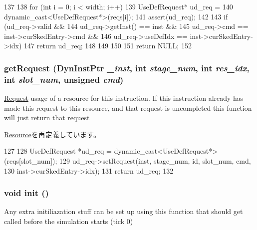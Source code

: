 \begin{DoxyCode}
137 {
138     for (int i = 0; i < width; i++) {
139         UseDefRequest* ud_req =
140             dynamic_cast<UseDefRequest*>(reqs[i]);
141         assert(ud_req);
142 
143         if (ud_req->valid &&
144             ud_req->getInst() == inst &&
145             ud_req->cmd == inst->curSkedEntry->cmd &&
146             ud_req->useDefIdx == inst->curSkedEntry->idx) {
147             return ud_req;
148         }
149     }
150 
151     return NULL;
152 }
\end{DoxyCode}
\hypertarget{classUseDefUnit_aae5ce84f94a1057d7f60172daf5d731d}{
\subsubsection[{getRequest}]{ getRequest ({\bf DynInstPtr} {\em \_\-inst}, \/  int {\em stage\_\-num}, \/  int {\em res\_\-idx}, \/  int {\em slot\_\-num}, \/  unsigned {\em cmd})}}
\label{classUseDefUnit_aae5ce84f94a1057d7f60172daf5d731d}
\hyperlink{classRequest}{Request} usage of a resource for this instruction. If this instruction already has made this request to this resource, and that request is uncompleted this function will just return that request 

\hyperlink{classResource_aae5ce84f94a1057d7f60172daf5d731d}{Resource}を再定義しています。


\begin{DoxyCode}
127 {
128     UseDefRequest *ud_req = dynamic_cast<UseDefRequest*>(reqs[slot_num]);
129     ud_req->setRequest(inst, stage_num, id, slot_num, cmd,
130                        inst->curSkedEntry->idx);
131     return ud_req;
132 }
\end{DoxyCode}
\hypertarget{classUseDefUnit_a02fd73d861ef2e4aabb38c0c9ff82947}{
\subsubsection[{init}]{\setlength{\rightskip}{0pt plus 5cm}void init ()}}
\label{classUseDefUnit_a02fd73d861ef2e4aabb38c0c9ff82947}
Any extra initiliazation stuff can be set up using this function that should get called before the simulation starts (tick 0) 


